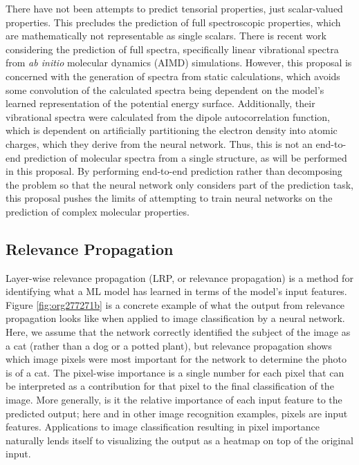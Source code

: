 \documentclass[12pt]{article}
\begin{document}
There have not been attempts to predict tensorial properties, just scalar-valued properties. This precludes the prediction of full spectroscopic properties, which are mathematically not representable as single scalars. There is recent work considering the prediction of full spectra, specifically linear vibrational spectra from \emph{ab initio} molecular dynamics (AIMD) simulations\cite{2017arXiv170505907G}. However, this proposal is concerned with the generation of spectra from static calculations, which avoids some convolution of the calculated spectra being dependent on the model's learned representation of the potential energy surface. Additionally, their vibrational spectra were calculated from the dipole autocorrelation function, which is dependent on artificially partitioning the electron density into atomic charges, which they derive from the neural network. Thus, this is not an end-to-end \cite{2016arXiv160407316B} prediction of molecular spectra from a single structure, as will be performed in this proposal. By performing end-to-end prediction rather than decomposing the problem so that the neural network only considers part of the prediction task, this proposal pushes the limits of attempting to train neural networks on the prediction of complex molecular properties.

\subsection{Relevance Propagation}
\label{sec:org43d10c3}

Layer-wise relevance propagation (LRP, or relevance propagation) is a method for identifying what a ML model has learned \cite{10.1371/journal.pone.0130140} in terms of the model's input features. Figure \ref{fig:org277271b} is a concrete example of what the output from relevance propagation looks like when applied to image classification by a neural network. Here, we assume that the network correctly identified the subject of the image as a cat (rather than a dog or a potted plant), but relevance propagation shows which image pixels were most important for the network to determine the photo is of a cat. The pixel-wise importance is a single number for each pixel that can be interpreted as a contribution for that pixel to the final classification of the image. More generally, is it the relative importance of each input feature to the predicted output; here and in other image recognition examples, pixels are input features. Applications to image classification resulting in pixel importance naturally lends itself to visualizing the output as a heatmap on top of the original input.
\end{document}
